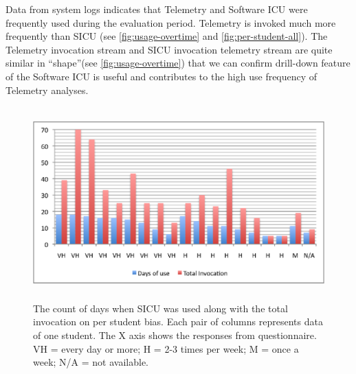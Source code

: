 \documentclass[11pt]{article}
\begin{document}
Data from system logs indicates that Telemetry and Software ICU were frequently used during the evaluation period. Telemetry is invoked much more frequently than SICU (see \autoref{fig:usage-overtime} and \autoref{fig:per-student-all}). The Telemetry invocation stream and SICU invocation telemetry stream are quite similar in ``shape''(see \autoref{fig:usage-overtime}) that we can confirm drill-down feature of the Software ICU is useful and contributes to the high use frequency of Telemetry analyses. 

\begin{figure}[htbp] %
   \centering
   \includegraphics[height=20em]{sicu-usage-verification} 
   \caption{The count of days when SICU was used along with the total invocation on per student bias. Each pair of columns represents data of one student. The X axis shows the responses from questionnaire. VH = every day or more; H = 2-3 times per week; M = once a week; N/A = not available.}
   \label{fig:sicu-usage-verification}
\end{figure}
\end{document}
